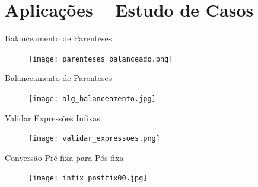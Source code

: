 %

\section{Aplicações -- Estudo de Casos}

\begin{frame}[c]{Balanceamento de Parenteses} 

		   	\begin{figure}[!htpb]
				\centering
				\texttt{[image: parenteses\_balanceado.png]}
			\end{figure} 
\end{frame}


\begin{frame}[c]{Balanceamento de Parenteses} 

		   	\begin{figure}[!htpb]
				\centering
				\texttt{[image: alg\_balanceamento.jpg]}
			\end{figure} 
\end{frame}


\begin{frame}[c]{Validar Expressões Infixas} 

		   	\begin{figure}[!htpb]
				\centering
				\texttt{[image: validar\_expressoes.png]}
			\end{figure} 
\end{frame}


\begin{frame}[c]{Conversão Pré-fixa para Pós-fixa} 

		   	\begin{figure}[!htpb]
				\centering
				\texttt{[image: infix\_postfix00.jpg]}
			\end{figure} 

\end{frame}



